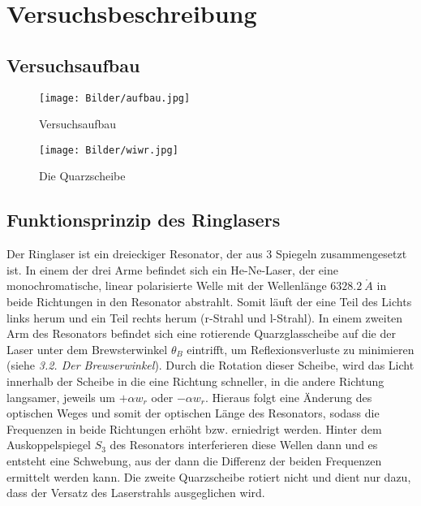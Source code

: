 \section{Versuchsbeschreibung}

\subsection{Versuchsaufbau}

\begin{figure}[H]
	\centering \texttt{[image: Bilder/aufbau.jpg]}
	\caption{Versuchsaufbau}
\end{figure}

\begin{figure}[H]
	\centering \texttt{[image: Bilder/wiwr.jpg]}
	\caption{Die Quarzscheibe}
\end{figure}

\subsection{Funktionsprinzip des Ringlasers}

Der Ringlaser ist ein dreieckiger Resonator, der aus 3 Spiegeln zusammengesetzt ist. In einem der drei Arme befindet sich ein He-Ne-Laser, der eine monochromatische, linear polarisierte Welle mit der Wellenlänge $6328.2 \ \mathring A$ in beide Richtungen in den Resonator abstrahlt. Somit läuft der eine Teil des Lichts links herum und ein Teil rechts herum (r-Strahl und l-Strahl). In einem zweiten Arm des Resonators befindet sich eine rotierende Quarzglasscheibe auf die der Laser unter dem Brewsterwinkel $\theta_B$ eintrifft, um Reflexionsverluste zu minimieren (siehe \emph{3.2. Der Brewserwinkel}). Durch die Rotation dieser Scheibe, wird das Licht innerhalb der Scheibe in die eine Richtung schneller, in die andere Richtung langsamer, jeweils um $+\alpha w_r$ oder $-\alpha w_r$. Hieraus folgt eine Änderung des optischen Weges und somit der optischen Länge des Resonators, sodass die Frequenzen in beide Richtungen erhöht bzw. erniedrigt werden. Hinter dem Auskoppelspiegel $S_3$ des Resonators interferieren diese Wellen dann und es entsteht eine Schwebung, aus der dann die Differenz der beiden Frequenzen ermittelt werden kann. Die zweite Quarzscheibe rotiert nicht und dient nur dazu, dass der Versatz des Laserstrahls ausgeglichen wird.